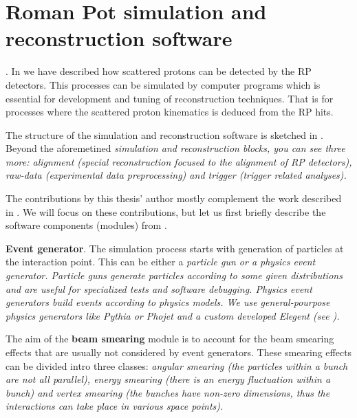 \iffalse
RP, MC, IP5, CMS, T1, T2, VFAT, DIGI, RECO, LAB, LHC, LS, DPE, MC, TOTEM, RMS, ndf
\fi


\chapter[sr]{Roman Pot simulation and reconstruction software}


. In  we have described how scattered protons can be detected by the RP detectors. This processes can be simulated by computer programs which is essential for development and tuning of reconstruction techniques. That is for processes where the scattered proton kinematics is deduced from the RP hits.



The structure of the simulation and reconstruction software is sketched in . Beyond the aforemetined \em{simulation} and \em{reconstruction} blocks, you can see three more: \em{alignment} (special reconstruction focused to the alignment of RP detectors), \em{raw-data} (experimental data preprocessing) and \em{trigger} (trigger related analyses).

The contributions by this thesis' author mostly complement the work described in . We will focus on these contributions, but let us first briefly describe the software components (modules) from .

\> {\bf Event generator}.
The simulation process starts with generation of particles at the interaction point. This can be either a \em{particle gun} or a \em{physics event generator}. Particle guns generate particles according to some given distributions and are useful for specialized tests and software debugging. Physics event generators build events according to physics models. We use general-pourpose physics generators like Pythia  or Phojet  and a custom developed Elegent (see ).

\> The aim of the {\bf beam smearing} module is to account for the beam smearing effects that are usually not considered by event generators. These smearing effects can be divided intro three classes: \em{angular smearing} (the particles within a bunch are not all parallel), \em{energy smearing} (there is an energy fluctuation within a bunch) and \em{vertex smearing} (the bunches have non-zero dimensions, thus the interactions can take place in various space points).

